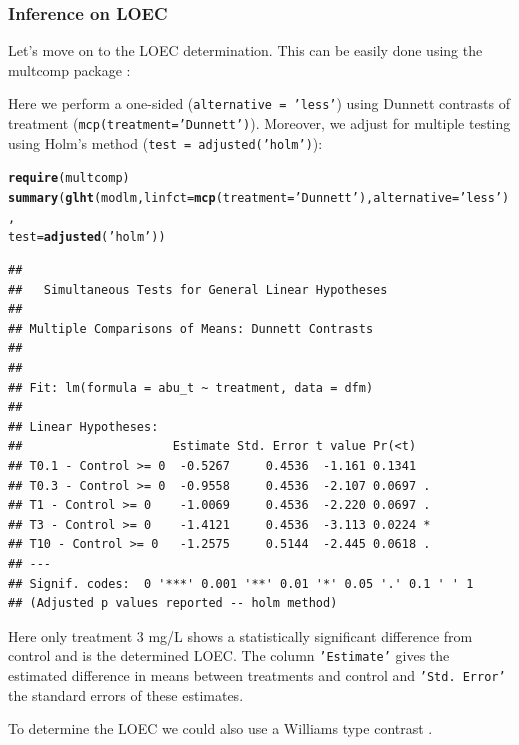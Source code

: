\documentclass{scrartcl}\usepackage[]{graphicx}\usepackage[]{color}
\makeatletter
\newcommand{\hlstr}[1]{\textcolor[rgb]{0.192,0.494,0.8}{#1}}%
\newcommand{\hlstd}[1]{\textcolor[rgb]{0.345,0.345,0.345}{#1}}%
\newcommand{\hlkwc}[1]{\textcolor[rgb]{0.333,0.667,0.333}{#1}}%
\newcommand{\hlkwd}[1]{\textcolor[rgb]{0.737,0.353,0.396}{\textbf{#1}}}%
\newenvironment{kframe}{%
 \def\at@end@of@kframe{}%
 \ifinner\ifhmode%
  \def\at@end@of@kframe{\end{minipage}}%
  \begin{minipage}{\columnwidth}%
 \fi\fi%
 \def\FrameCommand##1{\hskip\@totalleftmargin \hskip-\fboxsep
 \colorbox{shadecolor}{##1}\hskip-\fboxsep
     \hskip-\linewidth \hskip-\@totalleftmargin \hskip\columnwidth}%
 \MakeFramed {\advance\hsize-\width
   \@totalleftmargin\z@ \linewidth\hsize
   \@setminipage}}%
 {\par\unskip\endMakeFramed%
 \at@end@of@kframe}
\newenvironment{knitrout}{}{} %
\renewenvironment{knitrout}{\begin{spacing}{1}}{\end{spacing}}
\makeatother
\begin{document}
\subsubsection{Inference on LOEC}
Let's move on to the LOEC determination.
This can be easily done using the multcomp package \citep{hothorn_simultaneous_2008}:

Here we perform a one-sided (\texttt{alternative = 'less'}) using Dunnett contrasts of treatment (\texttt{mcp(treatment='Dunnett')}).
Moreover, we adjust for multiple testing using Holm's method (\texttt{test = adjusted('holm')}):
\begin{knitrout}
\color{fgcolor}\begin{kframe}
\begin{alltt}
\hlkwd{require}\hlstd{(multcomp)}
\hlkwd{summary}\hlstd{(}\hlkwd{glht}\hlstd{(modlm,} \hlkwc{linfct} \hlstd{=} \hlkwd{mcp}\hlstd{(}\hlkwc{treatment} \hlstd{=} \hlstr{'Dunnett'}\hlstd{),}  \hlkwc{alternative} \hlstd{=} \hlstr{'less'}\hlstd{),}
        \hlkwc{test} \hlstd{=} \hlkwd{adjusted}\hlstd{(}\hlstr{'holm'}\hlstd{))}
\end{alltt}
\begin{verbatim}
## 
## 	 Simultaneous Tests for General Linear Hypotheses
## 
## Multiple Comparisons of Means: Dunnett Contrasts
## 
## 
## Fit: lm(formula = abu_t ~ treatment, data = dfm)
## 
## Linear Hypotheses:
##                     Estimate Std. Error t value Pr(<t)  
## T0.1 - Control >= 0  -0.5267     0.4536  -1.161 0.1341  
## T0.3 - Control >= 0  -0.9558     0.4536  -2.107 0.0697 .
## T1 - Control >= 0    -1.0069     0.4536  -2.220 0.0697 .
## T3 - Control >= 0    -1.4121     0.4536  -3.113 0.0224 *
## T10 - Control >= 0   -1.2575     0.5144  -2.445 0.0618 .
## ---
## Signif. codes:  0 '***' 0.001 '**' 0.01 '*' 0.05 '.' 0.1 ' ' 1
## (Adjusted p values reported -- holm method)
\end{verbatim}
\end{kframe}
\end{knitrout}

Here only treatment 3 mg/L shows a statistically significant difference from control and is the determined LOEC.
The column \texttt{'Estimate'} gives the estimated difference in means between treatments and control and \texttt{'Std. Error'} the standard errors of these estimates.


To determine the LOEC we could also use a Williams type contrast  \citep{bretz_multiple_2010}. 
\end{document}
